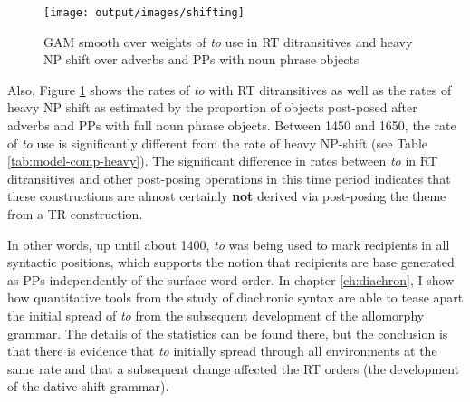 \begin{figure}[t!]
	\texttt{[image: output/images/shifting]}
	\caption{GAM smooth over weights of \textit{to} use in RT ditransitives and heavy NP shift over adverbs and PPs with noun phrase objects}
	\label{fig:shifting}
\end{figure}

Also, Figure \ref{fig:shifting} shows the rates of \textit{to} with RT ditransitives as well as the rates of heavy NP shift as estimated by the proportion of objects post-posed after adverbs and PPs with full noun phrase objects. Between 1450 and 1650, the rate of \textit{to} use is significantly different from the rate of heavy NP-shift (see Table \ref{tab:model-comp-heavy}). The significant difference in rates between \textit{to} in RT ditransitives and other post-posing operations in this time period indicates that these constructions are almost certainly \textbf{not} derived via post-posing the theme from a TR construction.

In other words, up until about 1400, \textit{to} was being used to mark recipients in all syntactic positions, which supports the notion that recipients are base generated as PPs independently of the surface word order. In chapter \ref{ch:diachron}, I show how quantitative tools from the study of diachronic syntax are able to tease apart the initial spread of \textit{to} from the subsequent development of the allomorphy grammar. The details of the statistics can be found there, but the conclusion is that there is evidence that \textit{to} initially spread through all environments at the same rate and that a subsequent change affected the RT orders (the development of the dative shift grammar).

